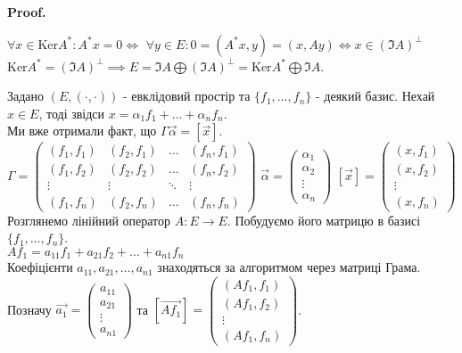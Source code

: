\documentclass[a4paper, 10pt]{article}
\makeatletter
\def\qed{$\blacksquare$}
\def\ker#1{\textrm{Ker} {#1}}
\theoremstyle{theoremdd}
\theoremstyle{theoremdd}
\theoremstyle{theoremdd}
\theoremstyle{theoremdd}
\theoremstyle{theoremdd}
\theoremstyle{theoremdd}
\theoremstyle{theoremdd}
\theoremstyle{theoremdd}
\renewenvironment{proof}[1][Proof.\\]{\par
\pushQED{\hfill \qed}%
\normalfont \topsep6\p@\@plus6\p@\relax
\trivlist
\item\relax
{\bfseries
#1\@addpunct{.}}\hspace\labelsep\ignorespaces
}{%
\popQED\endtrivlist\@endpefalse
}
\makeatother
\begin{document}
\begin{proof}
$\forall x \in \ker A^*: A^* x = 0 \iff$ $\forall y \in E: 0 = (A^*x,y) = (x, Ay) \iff x \in (\Im A)^{\perp}$\\
$\ker A^* = (\Im A)^{\perp} \implies E = \Im A \bigoplus (\Im A)^{\perp} = \ker A^* \bigoplus \Im A$.
\end{proof}

Задано $(E,(\cdot,\cdot))$ - евклідовий простір та $\{f_1,\dots,f_n\}$ - деякий базис. Нехай $x \in E$, тоді звідси $x = \alpha_1 f_1 + \dots + \alpha_n f_n$.\\
Ми вже отримали факт, що $\Gamma \vec{\alpha} = [\vec{x}]$.\\
$\Gamma = \begin{pmatrix}
(f_1,f_1) & (f_2,f_1) & \dots & (f_n,f_1) \\
(f_1,f_2) & (f_2,f_2) & \dots & (f_n,f_2) \\
\vdots & \vdots & \ddots & \vdots \\
(f_1,f_n) & (f_2,f_n) & \dots & (f_n,f_n)
\end{pmatrix}$ \hspace{1cm}
$\vec{\alpha} = \begin{pmatrix}
\alpha_1 \\ \alpha_2 \\ \vdots \\ \alpha_n
\end{pmatrix}$ \hspace{1cm}
$[\vec{x}] = \begin{pmatrix}
(x,f_1) \\ (x,f_2) \\ \vdots \\ (x,f_n)
\end{pmatrix}$
\\
Розглянемо лінійний оператор $A: E \to E$. Побудуємо його матрицю в базисі $\{f_1,\dots,f_n\}$.\\
$Af_1 = a_{11}f_1 + a_{21}f_2 + \dots + a_{n1}f_n$\\
Коефіцієнти $a_{11},a_{21},\dots,a_{n1}$ знаходяться за алгоритмом через матриці Грама.\\
Позначу $\vec{a_1} = \begin{pmatrix}
a_{11} \\ a_{21} \\ \vdots \\ a_{n1}
\end{pmatrix}$ та $[\vec{Af_1}] = \begin{pmatrix}
(Af_1,f_1) \\ (Af_1,f_2) \\ \vdots \\ (Af_1,f_n)
\end{pmatrix}$.\\
\end{document}
